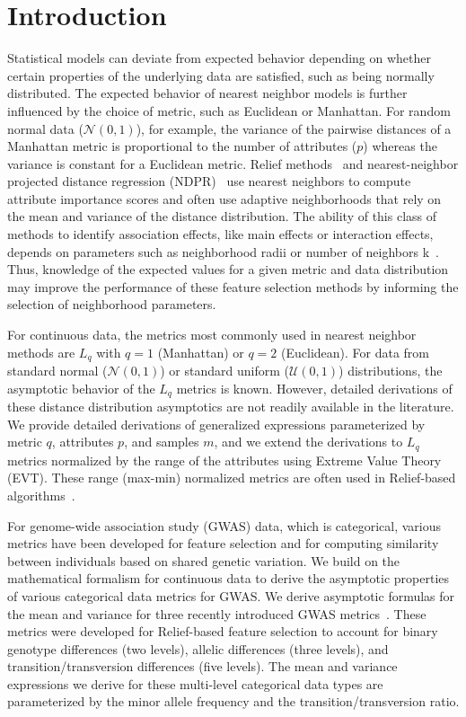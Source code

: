 \documentclass[10pt,letterpaper]{article}
\begin{document}
\linenumbers

\section*{Introduction}
	Statistical models can deviate from expected behavior depending on whether certain properties of the underlying data are satisfied, such as being normally distributed. The expected behavior of nearest neighbor models is further influenced by the choice of metric, such as Euclidean or Manhattan. For random normal data ($\mathcal{N}(0,1)$), for example, the variance of the pairwise distances of a Manhattan metric is proportional to the number of attributes ($p$) whereas the variance is constant for a Euclidean metric. Relief methods~\cite{urbanowicz17,urbanowicz17b,robnik2003} and nearest-neighbor projected distance regression (NDPR)~\cite{npdr} use nearest neighbors to compute attribute importance scores and often use adaptive neighborhoods that rely on the mean and variance of the distance distribution. The ability of this class of methods to identify association effects, like main effects or interaction effects, depends on parameters such as neighborhood radii or number of neighbors k~\cite{stir,mckinney13}. Thus, knowledge of the expected values for a given metric and data distribution may improve the performance of these feature selection methods by informing the selection of neighborhood parameters. 

For continuous data, the metrics most commonly used in nearest neighbor methods are $L_q$ with $q=1$ (Manhattan) or $q=2$ (Euclidean). For data from standard normal ($\mathcal{N}(0,1)$) or standard uniform ($\mathcal{U}(0,1)$) distributions, the asymptotic behavior of the $L_q$ metrics is known. However, detailed derivations of these distance distribution asymptotics are not readily available in the literature. We provide detailed derivations of generalized expressions parameterized by metric $q$, attributes $p$, and samples $m$, and we extend the derivations to $L_q$ metrics normalized by the range of the attributes using Extreme Value Theory (EVT). These range (max-min) normalized metrics are often used in Relief-based algorithms~\cite{robnik2003}. 

For genome-wide association study (GWAS) data, which is categorical, various metrics have been developed for feature selection and for computing similarity between individuals based on shared genetic variation. We build on the mathematical formalism for continuous data to derive the asymptotic properties of various categorical data metrics for GWAS. We derive asymptotic formulas for the mean and variance for three recently introduced GWAS metrics~\cite{arabnejad2018}. These metrics were developed for Relief-based feature selection to account for binary genotype differences (two levels), allelic differences (three levels), and transition/transversion differences (five levels). The mean and variance expressions we derive for these multi-level categorical data types are parameterized by the minor allele frequency and the transition/transversion ratio. 
\end{document}
